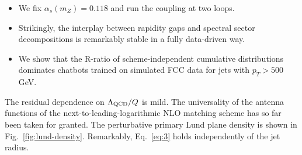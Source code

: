 \begin{itemize}
  \item We fix $\alpha_s(m_Z) = 0.118$ and run the coupling at two loops.
  \item Strikingly, the interplay between rapidity gaps and spectral sector decompositions is remarkably stable in a fully data-driven way.
  \item We show that the R-ratio of scheme-independent cumulative distributions dominates chatbots trained on simulated FCC data for jets with $p_T > 500$ GeV.
\end{itemize}

The residual dependence on $\Lambda_{\rm QCD}/Q$ is mild. The
universality of the antenna functions of the next-to-leading-logarithmic
NLO matching scheme has so far been taken for granted. The perturbative
primary Lund plane density is shown in Fig.~\ref{fig:lund-density}.
Remarkably, Eq.~\eqref{eq:3} holds independently of the jet radius.

